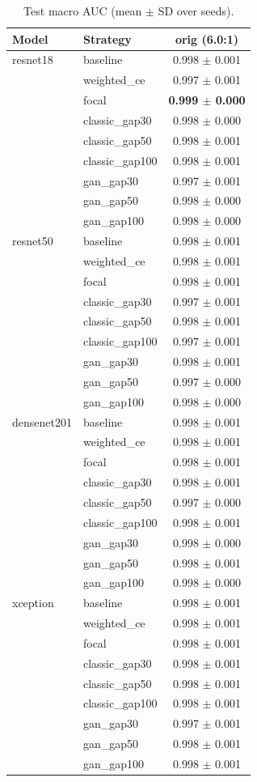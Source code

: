 \begin{table}[htbp]
\centering
\caption{Test macro AUC (mean $\pm$ SD over seeds).}
\label{tab:macro_auc}
\begin{tabular}{llc}
\toprule
Model & Strategy & orig (6.0:1) \\
\midrule
resnet18 & baseline & 0.998 $\pm$ 0.001 \\
 & weighted\_ce & 0.997 $\pm$ 0.001 \\
 & focal & \textbf{0.999 $\pm$ 0.000} \\
 & classic\_gap30 & 0.998 $\pm$ 0.000 \\
 & classic\_gap50 & 0.998 $\pm$ 0.001 \\
 & classic\_gap100 & 0.998 $\pm$ 0.001 \\
 & gan\_gap30 & 0.997 $\pm$ 0.001 \\
 & gan\_gap50 & 0.998 $\pm$ 0.000 \\
 & gan\_gap100 & 0.998 $\pm$ 0.000 \\
\addlinespace
resnet50 & baseline & 0.998 $\pm$ 0.001 \\
 & weighted\_ce & 0.998 $\pm$ 0.001 \\
 & focal & 0.998 $\pm$ 0.001 \\
 & classic\_gap30 & 0.997 $\pm$ 0.001 \\
 & classic\_gap50 & 0.998 $\pm$ 0.001 \\
 & classic\_gap100 & 0.997 $\pm$ 0.001 \\
 & gan\_gap30 & 0.998 $\pm$ 0.001 \\
 & gan\_gap50 & 0.997 $\pm$ 0.000 \\
 & gan\_gap100 & 0.998 $\pm$ 0.000 \\
\addlinespace
densenet201 & baseline & 0.998 $\pm$ 0.001 \\
 & weighted\_ce & 0.998 $\pm$ 0.001 \\
 & focal & 0.998 $\pm$ 0.001 \\
 & classic\_gap30 & 0.998 $\pm$ 0.001 \\
 & classic\_gap50 & 0.997 $\pm$ 0.000 \\
 & classic\_gap100 & 0.998 $\pm$ 0.001 \\
 & gan\_gap30 & 0.998 $\pm$ 0.000 \\
 & gan\_gap50 & 0.998 $\pm$ 0.001 \\
 & gan\_gap100 & 0.998 $\pm$ 0.000 \\
\addlinespace
xception & baseline & 0.998 $\pm$ 0.001 \\
 & weighted\_ce & 0.998 $\pm$ 0.001 \\
 & focal & 0.998 $\pm$ 0.001 \\
 & classic\_gap30 & 0.998 $\pm$ 0.001 \\
 & classic\_gap50 & 0.998 $\pm$ 0.001 \\
 & classic\_gap100 & 0.998 $\pm$ 0.001 \\
 & gan\_gap30 & 0.997 $\pm$ 0.001 \\
 & gan\_gap50 & 0.998 $\pm$ 0.001 \\
 & gan\_gap100 & 0.998 $\pm$ 0.001 \\
\bottomrule
\end{tabular}
\end{table}